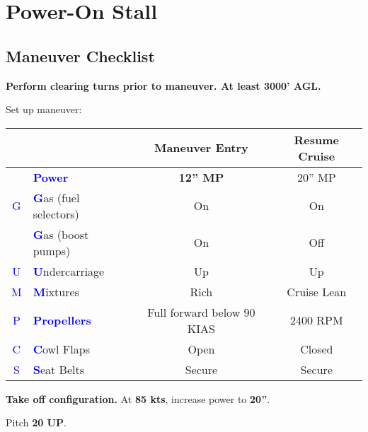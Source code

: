 {\section{Power-On Stall}
\subsection{Maneuver Checklist}

\textbf{Perform clearing turns prior to maneuver. At least 3000' AGL.}

Set up maneuver:

\begin{table}[H]
\centering
\begin{tabular}{|c|l|c|c|}
\hline
                    &                                                 & \textbf{Maneuver Entry} & \textbf{Resume Cruise} \\ \hline
                    & \textcolor{blue}{\textbf{Power}}                & \textbf{12'' MP}        & 20'' MP                \\ \hline
\textcolor{blue}{G} & \textcolor{blue}{\textbf{G}}as (fuel selectors) & On                      & On                     \\
                    & \textcolor{blue}{\textbf{G}}as (boost pumps)    & On                      & Off                    \\ \hline
\textcolor{blue}{U} & \textcolor{blue}{\textbf{U}}ndercarriage        & Up                      & Up                     \\ \hline
\textcolor{blue}{M} & \textcolor{blue}{\textbf{M}}ixtures             & Rich                    & Cruise Lean            \\ \hline
\textcolor{blue}{P} & \textcolor{blue}{\textbf{Propellers}}           & Full forward below 90 KIAS & 2400 RPM            \\ \hline
\textcolor{blue}{C} & \textcolor{blue}{\textbf{C}}owl Flaps           & Open                    & Closed                 \\ \hline
\textcolor{blue}{S} & \textcolor{blue}{\textbf{S}}eat Belts           & Secure                  & Secure                 \\ \hline
\end{tabular}
\end{table}

\textbf{Take off configuration.} At \textbf{85 kts}, increase power to \textbf{20''}.

Pitch \textbf{20\degree{} UP}.

}
